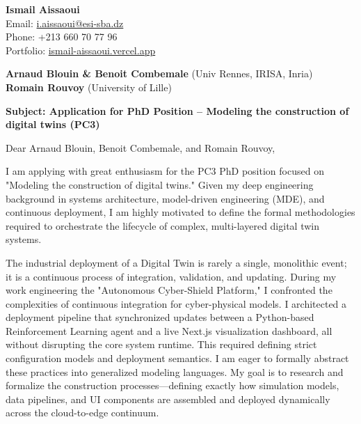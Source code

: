\documentclass[11pt,a4paper]{article}
\begin{document}
\thispagestyle{empty}

\begin{flushright}
\textbf{Ismail Aissaoui} \\
Email: \href{mailto:i.aissaoui@esi-sba.dz}{i.aissaoui@esi-sba.dz} \\
Phone: +213 660 70 77 96 \\
Portfolio: \href{https://ismail-aissaoui.vercel.app}{ismail-aissaoui.vercel.app}
\end{flushright}

\vspace{1em}

\begin{flushleft}
\textbf{Arnaud Blouin \& Benoit Combemale} (Univ Rennes, IRISA, Inria) \\
\textbf{Romain Rouvoy} (University of Lille)
\end{flushleft}

\vspace{1em}
\noindent\textbf{Subject: Application for PhD Position -- Modeling the construction of digital twins (PC3)}
\vspace{1em}

\noindent Dear Arnaud Blouin, Benoit Combemale, and Romain Rouvoy,

\vspace{1em}
\noindent
I am applying with great enthusiasm for the PC3 PhD position focused on "Modeling the construction of digital twins." Given my deep engineering background in systems architecture, model-driven engineering (MDE), and continuous deployment, I am highly motivated to define the formal methodologies required to orchestrate the lifecycle of complex, multi-layered digital twin systems.

\vspace{0.5em}
\noindent
The industrial deployment of a Digital Twin is rarely a single, monolithic event; it is a continuous process of integration, validation, and updating. During my work engineering the "Autonomous Cyber-Shield Platform," I confronted the complexities of continuous integration for cyber-physical models. I architected a deployment pipeline that synchronized updates between a Python-based Reinforcement Learning agent and a live Next.js visualization dashboard, all without disrupting the core system runtime. This required defining strict configuration models and deployment semantics. I am eager to formally abstract these practices into generalized modeling languages. My goal is to research and formalize the construction processes---defining exactly how simulation models, data pipelines, and UI components are assembled and deployed dynamically across the cloud-to-edge continuum.
\end{document}

